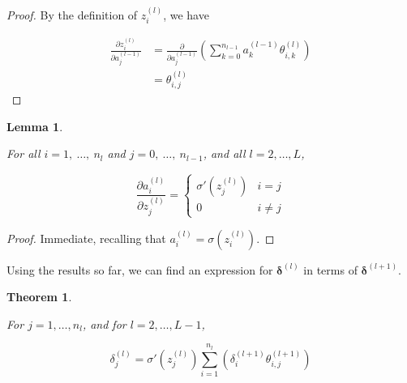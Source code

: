 \documentclass{article}[11pt]
\newtheorem{lemma}{Lemma}
\newtheorem{theorem}{Theorem}
\begin{document}
        \begin{proof}
            
            By the definition of $z^{(l)}_i$, we have
            
            $$ \begin{aligned}
            \frac{\partial z^{(l)}_i}{\partial a^{(l-1)}_j}
            &= \frac{\partial}{\partial a^{(l-1)}_j} \left( \sum_{k=0}^{n_{l-1}} a^{(l-1)}_k \theta^{(l)}_{i,k} \right) \\
            &= \theta^{(l)}_{i,j}
            \end{aligned} $$
            
        \end{proof}
    
    
        \begin{lemma} \label{thm:da_dz}
            
            For all $i = 1, \ \ldots, \ n_l$ and $j = 0, \ \ldots, \ n_{l-1}$, and all $l = 2, \ldots, L$,
            
            $$
            \frac{\partial a^{(l)}_i}{\partial z^{(l)}_j} = \begin{cases}
                \sigma'(z^{(l)}_j) & i = j \\
                0 & i \neq j
            \end{cases}
            $$
            
        \end{lemma}
        
        \begin{proof}
            
            Immediate, recalling that $a^{(l)}_i = \sigma(z^{(l)}_i)$.
            
        \end{proof}
        
        
        Using the results so far, we can find an expression for $\boldsymbol{\delta}^{(l)}$ in terms of $\boldsymbol{\delta}^{(l+1)}$.
        
        
        \begin{theorem} \label{thm:delta}
            
            For $j = 1, \ldots, n_l$, and for $l = 2, \ldots, L-1$,
            
            $$
            \delta^{(l)}_j = \sigma'(z^{(l)}_j) \sum_{i=1}^{n_l} \left( \delta^{(l+1)}_i \theta^{(l+1)}_{i,j} \right)
            $$
            
        \end{theorem}
    
\end{document}

